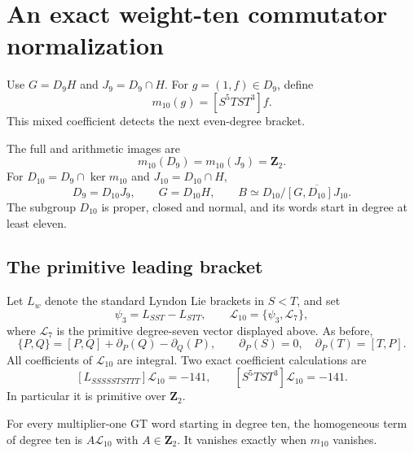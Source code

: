 \section{An exact weight-ten commutator normalization}
\label{sec:weight-ten-normalization}

Use $G=D_9H$ and $J_9=D_9\cap H$. For $g=(1,f)\in D_9$, define
\[
 m_{10}(g)=[S^5TST^3]f.
\]
This mixed coefficient detects the next even-degree bracket.

\begin{theorem}\label{thm:weight-ten-exact-image}
The full and arithmetic images are
\[
 m_{10}(D_9)=m_{10}(J_9)=\mathbf Z_2.
\]
For $D_{10}=D_9\cap\ker m_{10}$ and $J_{10}=D_{10}\cap H$,
\[
 D_9=D_{10}J_9,\qquad G=D_{10}H,\qquad
 B\simeq D_{10}/\overline{[G,D_{10}]J_{10}}.
\]
The subgroup $D_{10}$ is proper, closed and normal, and its words
start in degree at least eleven.
\end{theorem}

\subsection{The primitive leading bracket}

Let $L_w$ denote the standard Lyndon Lie brackets in $S<T$, and set
\[
 \psi_3=L_{SST}-L_{STT},\qquad
 \mathcal L_{10}=\{\psi_3,\mathcal L_7\},
\]
where $\mathcal L_7$ is the primitive degree-seven vector displayed
above. As before,
\[
 \{P,Q\}=[P,Q]+\partial_P(Q)-\partial_Q(P),\qquad
 \partial_P(S)=0,\quad\partial_P(T)=[T,P].
\]
All coefficients of $\mathcal L_{10}$ are integral. Two exact
coefficient calculations are
\begin{equation}\label{eq:weight-ten-unit-coefficient}
 [L_{SSSSSTSTTT}]\mathcal L_{10}=-141,
 \qquad [S^5TST^3]\mathcal L_{10}=-141.
\end{equation}
In particular it is primitive over $\mathbf Z_2$.

\begin{lemma}\label{lem:weight-ten-leading-line}
For every multiplier-one GT word starting in degree ten, the
homogeneous term of degree ten is $A\mathcal L_{10}$ with
$A\in\mathbf Z_2$. It vanishes exactly when $m_{10}$ vanishes.
\end{lemma}

